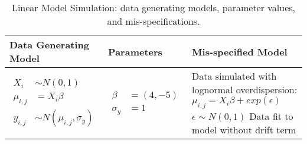 \begin{table}[h]
    \caption{Linear Model Simulation: data generating models, parameter values, and mis-specifications.}
    \begin{tabular}{llp{8cm}}
    \toprule
    Data Generating Model & Parameters & Mis-specified Model \\
    \hline
    {$\!\begin{aligned}
    X_{i} &\sim N(0, 1) \\
    \mu_{i, j} &= X_{i}\beta \\
    y_{i,j} &\sim N(\mu_{i,j}, \sigma_{y}) 
    \end{aligned}$}
    &
    {$\!\begin{aligned}
    \beta &= (4, -5) \\
    \sigma_{y} &= 1 
    \end{aligned}$}
    &
    Data simulated with lognormal overdispersion: \newline
    $\mu_{i, j} = X_{i}\beta + exp(\epsilon)$ \newline
    $\epsilon \sim N(0, 1)$ \newline
    Data fit to model without drift term\\
    \bottomrule
    \end{tabular}
    \end{table}